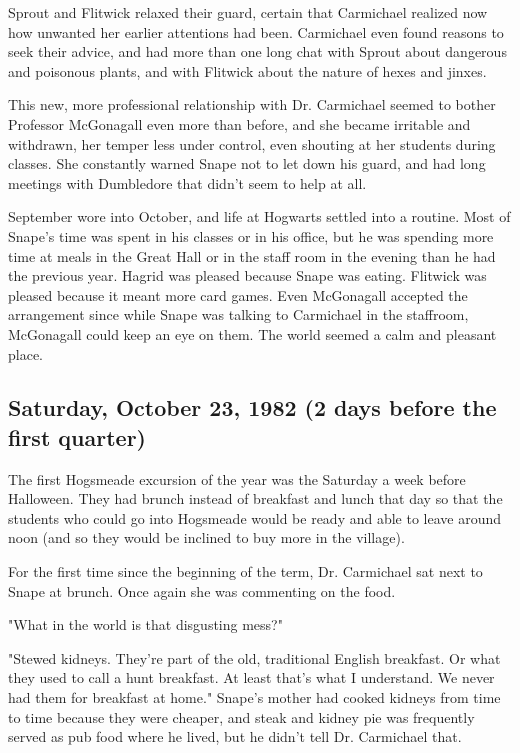 Sprout and Flitwick relaxed their guard, certain that Carmichael realized now how unwanted her earlier attentions had been. Carmichael even found reasons to seek their advice, and had more than one long chat with Sprout about dangerous and poisonous plants, and with Flitwick about the nature of hexes and jinxes.

This new, more professional relationship with Dr. Carmichael seemed to bother Professor McGonagall even more than before, and she became irritable and withdrawn, her temper less under control, even shouting at her students during classes. She constantly warned Snape not to let down his guard, and had long meetings with Dumbledore that didn't seem to help at all.

September wore into October, and life at Hogwarts settled into a routine. Most of Snape's time was spent in his classes or in his office, but he was spending more time at meals in the Great Hall or in the staff room in the evening than he had the previous year. Hagrid was pleased because Snape was eating. Flitwick was pleased because it meant more card games. Even McGonagall accepted the arrangement since while Snape was talking to Carmichael in the staffroom, McGonagall could keep an eye on them. The world seemed a calm and pleasant place.

\subsection{Saturday, October 23, 1982 (2 days before the first quarter)}

The first Hogsmeade excursion of the year was the Saturday a week before Halloween. They had brunch instead of breakfast and lunch that day so that the students who could go into Hogsmeade would be ready and able to leave around noon (and so they would be inclined to buy more in the village).

For the first time since the beginning of the term, Dr. Carmichael sat next to Snape at brunch. Once again she was commenting on the food.

"What in the world is that disgusting mess?"

"Stewed kidneys. They're part of the old, traditional English breakfast. Or what they used to call a hunt breakfast. At least that's what I understand. We never had them for breakfast at home." Snape's mother had cooked kidneys from time to time because they were cheaper, and steak and kidney pie was frequently served as pub food where he lived, but he didn't tell Dr. Carmichael that.

